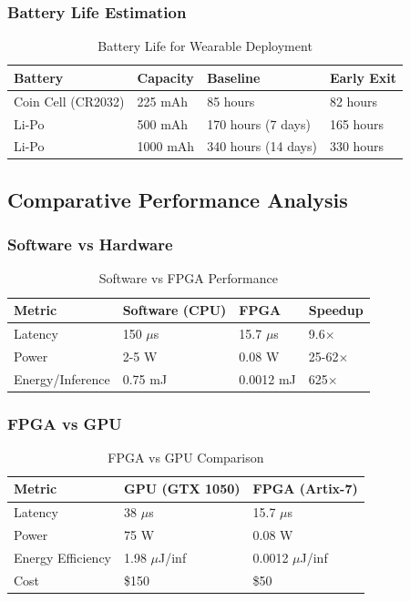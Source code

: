 \documentclass[11pt, a4paper]{article}
\begin{document}
\subsubsection{Battery Life Estimation}

\begin{table}[H]
\centering
\caption{Battery Life for Wearable Deployment}
\label{tab:battery}
\begin{tabular}{@{}llll@{}}
\toprule
\textbf{Battery} & \textbf{Capacity} & \textbf{Baseline} & \textbf{Early Exit} \\ \midrule
Coin Cell (CR2032) & 225 mAh & 85 hours & 82 hours \\
Li-Po & 500 mAh & 170 hours (7 days) & 165 hours \\
Li-Po & 1000 mAh & 340 hours (14 days) & 330 hours \\ \bottomrule
\end{tabular}
\end{table}

\subsection{Comparative Performance Analysis}

\subsubsection{Software vs Hardware}

\begin{table}[H]
\centering
\caption{Software vs FPGA Performance}
\label{tab:sw_vs_hw}
\begin{tabular}{@{}llll@{}}
\toprule
\textbf{Metric} & \textbf{Software (CPU)} & \textbf{FPGA} & \textbf{Speedup} \\ \midrule
Latency & 150 $\mu$s & 15.7 $\mu$s & 9.6$\times$ \\
Power & 2-5 W & 0.08 W & 25-62$\times$ \\
Energy/Inference & 0.75 mJ & 0.0012 mJ & 625$\times$ \\ \bottomrule
\end{tabular}
\end{table}

\subsubsection{FPGA vs GPU}

\begin{table}[H]
\centering
\caption{FPGA vs GPU Comparison}
\label{tab:fpga_vs_gpu}
\begin{tabular}{@{}lll@{}}
\toprule
\textbf{Metric} & \textbf{GPU (GTX 1050)} & \textbf{FPGA (Artix-7)} \\ \midrule
Latency & 38 $\mu$s & 15.7 $\mu$s \\
Power & 75 W & 0.08 W \\
Energy Efficiency & 1.98 $\mu$J/inf & 0.0012 $\mu$J/inf \\
Cost & \$150 & \$50 \\ \bottomrule
\end{tabular}
\end{table}
\end{document}
